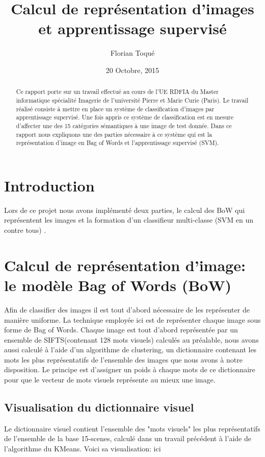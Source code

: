 \documentclass[a4paper]{article}
\title{Calcul de représentation d'images et apprentissage supervisé}
\author{Florian Toqué}
\date{20 Octobre, 2015}
\begin{document}
\maketitle

\begin{abstract}


Ce rapport porte sur un travail effectué au cours de l'UE RDFIA du Master informatique spécialité Imagerie de l'université Pierre et Marie Curie (Paris). Le travail réalisé consiste à mettre en place un système de classification d’images par apprentissage supervisé. Une fois appris ce système de classification est en mesure d’affecter une des 15 catégories sémantiques à une image de test donnée. Dans ce rapport nous expliquons une des parties nécessaire à ce système qui est la représentation d'image en Bag of Words et l'apprentissage supervisé (SVM). 
\end{abstract}

\section{Introduction}
Lors de ce projet nous avons implémenté deux parties, le calcul des BoW qui représentent les images et la formation d'un classifieur multi-classe (SVM en un contre tous) .


\section{Calcul de représentation d'image: le modèle Bag of Words (BoW)}
Afin de classifier des images il est tout d'abord nécessaire de les représenter de manière uniforme. La technique employée ici est de représenter chaque image sous forme de Bag of Words. Chaque image est tout d'abord représentée par un ensemble de SIFTS(contenant 128 mots visuels) calculés au préalable, nous avons aussi calculé à l'aide d'un algorithme de clustering, un dictionnaire contenant les mots les plus représentatifs de l'ensemble des images que nous avons à notre disposition. Le principe est d'assigner un poids à chaque mots de ce dictionnaire pour que le vecteur de mots visuels représente au mieux une image. 
\subsection{Visualisation du dictionnaire visuel}
Le dictionnaire visuel contient l'ensemble des "mots visuels" les plus représentatifs de l'ensemble de la base 15-scenes, calculé dans un travail précédent à l'aide de l'algorithme du KMeans. Voici sa visualisation: ici
\end{document}
